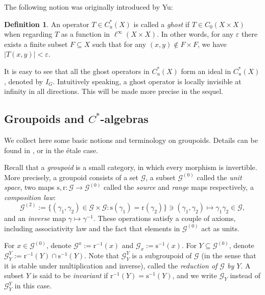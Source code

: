 \documentclass[12pt, a4paper]{amsart}
\numberwithin{equation}{section}
\theoremstyle{definition}
\newtheorem{defn}[thm]{Definition}
\theoremstyle{remark}
\newtheorem{rem}[thm]{Remark}
\def\G{\mathcal{G}}
\def\Gz{\mathcal{G}^{(0)}}
\def\r{\mathrm{r}}
\def\s{\mathrm{s}}
\begin{document}
The following notion was originally introduced by Yu:

\begin{defn}\label{defn: ghost operator}
An operator $T \in C^*_u(X)$ is called a \emph{ghost} if $T \in C_0(X \times X)$ when regarding $T$ as a function in $\ell^\infty(X \times X)$. In other words, for any $\varepsilon$ there exists a finite subset $F \subseteq X$ such that for any $(x,y) \notin F \times F$, we have $|T(x,y)| < \varepsilon$.
\end{defn}


It is easy to see that all the ghost operators in $C^*_u(X)$ form an ideal in $C^*_u(X)$, denoted by $I_G$. Intuitively speaking, a ghost operator is locally invisible at infinity in all directions. This will be made more precise in the sequel.


\subsection{Groupoids and $C^*$-algebras} \label{ssec:groupoids}

We collect here some basic notions and terminology on groupoids. Details can be found in \cite{Ren80}, or \cite{Sim17} in the \'{e}tale case.

Recall that a \emph{groupoid} is a small category, in which every morphism is invertible. More precisely, a groupoid consists of a set $\G$, a subset $\Gz$ called the \emph{unit space}, two maps $\s,\r: \G \to \Gz$ called the \emph{source} and \emph{range} maps respectively, a \emph{composition law}:
\[
\G^{(2)}:=\{(\gamma_1,\gamma_2) \in \G \times \G: \s(\gamma_1)=\r(\gamma_2)\}\ni(\gamma_1,\gamma_2) \mapsto \gamma_1\gamma_2 \in \G,
\]	
and an \emph{inverse} map $\gamma \mapsto \gamma^{-1}$. These operations satisfy a couple of axioms, including associativity law and the fact that elements in $\Gz$ act as units. 

For $x \in \Gz$, denote $\G^x:=\r^{-1}(x)$ and $\G_x:=\s^{-1}(x)$. 
For $Y\subseteq \Gz$, denote $\G_Y^Y:=\r^{-1}(Y) \cap \s^{-1}(Y)$. 
Note that $\G_Y^Y$ is a subgroupoid of $\G$ (in the sense that it is stable under multiplication and inverse), called the \emph{reduction of $\G$ by $Y$}. 
A subset $Y$ is said to be \emph{invariant} if $\r^{-1}(Y)=\s^{-1}(Y)$, and we write $\G_Y$ instead of $\G_Y^Y$ in this case.
\end{document}
